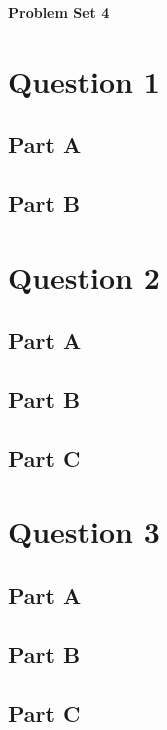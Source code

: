 \documentclass[letterpaper]{article}
\begin{document}
\vspace*{6pt}

\noindent \textbf{\huge{Problem Set 4}}

\bigskip

\section*{Question 1}

\subsection*{Part A}

\subsection*{Part B}

\newpage

\section*{Question 2}

\subsection*{Part A}

\subsection*{Part B}

\subsection*{Part C}

\newpage

\section*{Question 3}

\subsection*{Part A}

\subsection*{Part B}

\subsection*{Part C}
\end{document}
